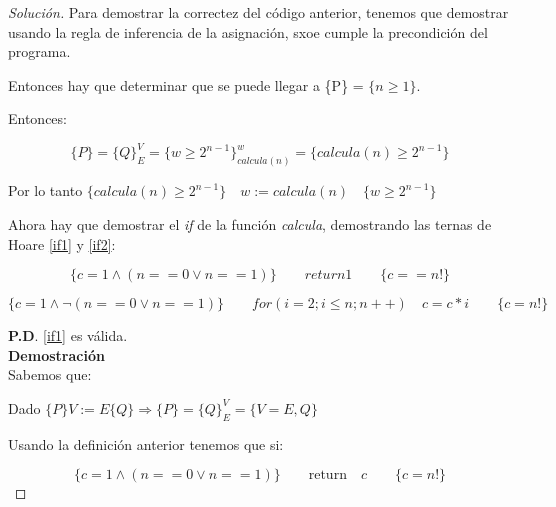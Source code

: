 \begin{proof}[Solución]

  Para demostrar la correctez del código anterior, tenemos que
  demostrar usando la regla de inferencia de la asignación, sxoe cumple
  la precondición del programa.

  Entonces hay que determinar que se puede llegar a \{P\} = $\{n \ge
  1\}$.

  Entonces:

  \begin{equation}
    \label{hoare}
    \{P\} = \{Q\}^V_E = \{w \ge 2^{n-1}\}^w_{calcula(n)} = \{calcula(n)
    \ge 2 ^{n - 1}\}
  \end{equation}

  Por lo tanto $\{calcula(n) \ge 2^{n - 1}\} \hspace{1em} w:= calcula(n) \hspace{1em} \{w \ge 2^{n - 1}\}$

  Ahora hay que demostrar el \textit{if} de la función \textit{calcula},
  demostrando las ternas de Hoare \ref{if1} y \ref{if2}:

  \begin{equation}
    \label{if1}
    \{c = 1 \land (n == 0 \lor n == 1)\} \hspace{2em} return 1 \hspace{2em} \{c == n!\}
  \end{equation}

  \begin{equation}
    \label{if2}
   \{c = 1 \land \neg (n == 0 \lor n == 1)\} \hspace{2em} for(i = 2; i \leq n;
   n++)\hspace{1em} c = c * i \hspace{2em}\{c = n!\}
  \end{equation}

  \textbf{P.D}. \ref{if1} es válida.\\
  \textbf{Demostración}\\

  Sabemos que:

  Dado $\{P\} V:=E \{Q\} \Rightarrow \{P\} = \{Q\}^V_E = \{V=E, Q\}$

  Usando la definición anterior tenemos que si:

  \begin{equation*}
    \{c = 1 \land (n == 0 \lor n == 1)\} \hspace{2em} \text{return}\hspace{1em} c
    \hspace{2em} \{c = n!\}
  \end{equation*}


\end{proof}
